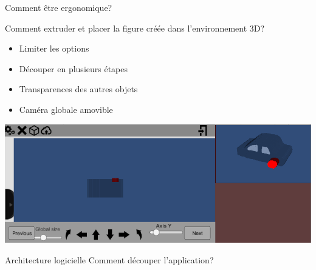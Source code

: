 \documentclass[a4paper,10pt]{beamer}
\begin{document}
		\begin{frame}{Comment être ergonomique?}
			
			Comment extruder et placer la figure créée dans l'environnement 3D?
			\begin{itemize}
				\item Limiter les options
				\item Découper en plusieurs étapes
				\item Transparences des autres objets
				\item Caméra globale amovible
			\end{itemize}
			
				\centerline{\includegraphics[scale=0.4]{images/Nono/img4.png}} 
			
			
		\end{frame}	
			
	
	\begin{frame}{Architecture logicielle} %
		\huge Comment découper l'application?
	\end{frame}
	
\end{document}
